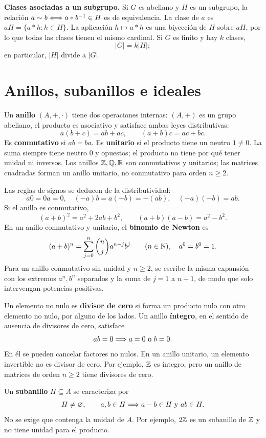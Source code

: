 \textbf{Clases asociadas a un subgrupo.} Si $G$ es abeliano y $H$ es un
subgrupo, la relación $a\sim b\Longleftrightarrow a*b^{-1}\in H$ es de equivalencia.
La clase de $a$ es $aH=\{a*h:h\in H\}$. La aplicación $h\mapsto a*h$
es una biyección de $H$ sobre $aH$, por lo que todas las clases tienen
el mismo cardinal. Si $G$ es finito y hay $k$ clases,
\[
 |G|=k|H|;
\]
en particular, $|H|$ divide a $|G|$.

\section{Anillos, subanillos e ideales}
\label{sec:anillos}
Un \textbf{anillo} $(A,+,\cdot)$ tiene dos operaciones internas:
$(A,+)$ es un grupo abeliano, el producto es asociativo y satisface
ambas leyes distributivas:
\[
 a(b+c)=ab+ac,\qquad (a+b)c=ac+bc.
\]
Es \textbf{conmutativo} si $ab=ba$. Es \textbf{unitario} si el producto
tiene un neutro $1\ne0$. La suma siempre tiene neutro $0$ y opuestos;
el producto no tiene por qué tener unidad ni inversos.
Los anillos $\mathbb{Z},\mathbb{Q},\mathbb{R}$ son conmutativos y unitarios; las matrices
cuadradas forman un anillo unitario, no conmutativo para orden $n\ge2$.

Las reglas de signos se deducen de la distributividad:
\[
 a0=0a=0,\quad (-a)b=a(-b)=-(ab),\quad (-a)(-b)=ab.
\]
Si el anillo es conmutativo,
\[
 (a+b)^2=a^2+2ab+b^2,\qquad (a+b)(a-b)=a^2-b^2.
\]
En un anillo conmutativo y unitario, el \textbf{binomio de Newton} es
\[
 (a+b)^n=\sum_{j=0}^{n}\binom nj a^{n-j}b^j\qquad(n\in\mathbb{N}),
 \quad a^0=b^0=1.
\]
Para un anillo conmutativo sin unidad y $n\ge2$, se escribe la misma
expansión con los extremos $a^n,b^n$ separados y la suma de $j=1$ a $n-1$,
de modo que solo intervengan potencias positivas.

Un elemento no nulo es \textbf{divisor de cero} si forma un producto
nulo con otro elemento no nulo, por alguno de los lados. Un anillo
\textbf{íntegro}, en el sentido de ausencia de divisores de cero, satisface
\[
 ab=0\imp a=0\ \text{o}\ b=0.
\]
En él se pueden cancelar factores no nulos. En un anillo unitario,
un elemento invertible no es divisor de cero. Por ejemplo, $\mathbb{Z}$ es
íntegro, pero un anillo de matrices de orden $n\ge2$ tiene divisores de cero.

Un \textbf{subanillo} $H\subseteq A$ se caracteriza por
\[
 H\ne\varnothing,\qquad a,b\in H\Longrightarrow a-b\in H\ \text{y}\ ab\in H.
\]
No se exige que contenga la unidad de $A$. Por ejemplo, $2\mathbb{Z}$ es un
subanillo de $\mathbb{Z}$ y no tiene unidad para el producto.

